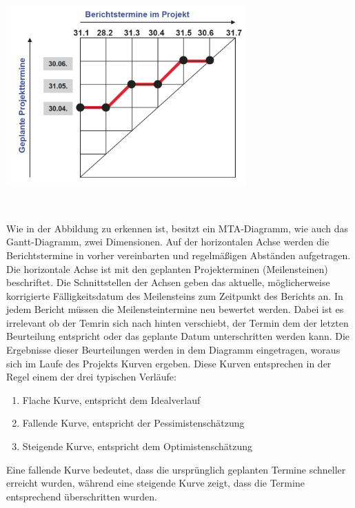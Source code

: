 \documentclass[a4paper]{article}
\makeatletter
\newcommand\liststyleLSxvi{%
\renewcommand\theenumi{\arabic{enumi}}
\renewcommand\theenumii{\alph{enumii}}
\renewcommand\theenumiii{\roman{enumiii}}
\renewcommand\theenumiv{\arabic{enumiv}}
\renewcommand\labelenumi{\theenumi.}
\renewcommand\labelenumii{\theenumii.}
\renewcommand\labelenumiii{\theenumiii.}
\renewcommand\labelenumiv{\theenumiv.}
}
\newcommand\captionof[1]{\def\@captype{#1}\caption}
\makeatother
\begin{document}
\bigskip

{\centering\sffamily
\includegraphics[width=9.225cm,height=6.92cm]{INMAusarbeitung02-img/INMAusarbeitung02-img007.png}
\captionof{figure}[Aufteilung der Achsen der MTA]{Aufteilung der Achsen der MTA}
\label{seq:refIllustration6}
 \ 
\par}

{\sffamily
Wie in der Abbildung zu erkennen ist, besitzt ein MTA-Diagramm, wie auch das Gantt-Diagramm, zwei Dimensionen. Auf der
horizontalen Achse werden die Berichtstermine in vorher vereinbarten und regelmäßigen Abständen aufgetragen. Die
horizontale Achse ist mit den geplanten Projekterminen (Meilensteinen) beschriftet. Die Schnittstellen der Achsen geben
das aktuelle, möglicherweise korrigierte Fälligkeitsdatum des Meilensteins zum Zeitpunkt des Berichts an. In jedem
Bericht müssen die Meilensteintermine neu bewertet werden. Dabei ist es irrelevant ob der Temrin sich nach hinten
verschiebt, der Termin dem der letzten Beurteilung entspricht oder das geplante Datum unterschritten werden kann. Die
Ergebnisse dieser Beurteilungen werden in dem Diagramm eingetragen, woraus sich im Laufe des Projekts Kurven ergeben.
Diese Kurven entsprechen in der Regel einem der drei typischen Verläufe:}


\bigskip

\liststyleLSxvi
\begin{enumerate}
\item {\sffamily
Flache Kurve, entspricht dem Idealverlauf}
\item {\sffamily
Fallende Kurve, entspricht der Pessimistenschätzung}
\item {\sffamily
Steigende Kurve, entspricht dem Optimistenschätzung}
\end{enumerate}

\bigskip

{\sffamily
Eine fallende Kurve bedeutet, dass die ursprünglich geplanten Termine schneller erreicht wurden, während eine steigende
Kurve zeigt, dass die Termine entsprechend überschritten wurden.}
\end{document}
